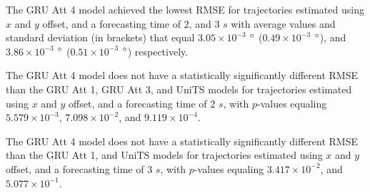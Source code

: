 \documentclass[preprint,12pt]{elsarticle}
\begin{document}
\begin{table}[!ht]
	\centering
	\caption{The average RMSE in $\degree$ ($\times 10^{-3}$), with standard deviation in brackets, across $k$-fold validation datasets for the trajectories in the $k$-fold testing datasets estimated using $x$ and $y$ offset, different RNN models, and forecasting times.}
	\label{tab:best_no_abs_RMSE}
\end{table}

The GRU Att 4 model achieved the lowest RMSE for trajectories estimated using $x$ and $y$ offset, and a forecasting time of $2$, and $3$ $s$ with average values and standard deviation (in brackets) that equal $3.05 \times 10^{-3}$ $\degree$ ($0.49 \times 10^{-3}$ $\degree$), and $3.86 \times 10^{-3}$ $\degree$ ($0.51 \times 10^{-3}$ $\degree$) respectively.

The GRU Att 4 model does not have a statistically significantly different RMSE than the GRU Att 1, GRU Att 3, and UniTS models for trajectories estimated using $x$ and $y$ offset, and a forecasting time of $2$ $s$, with $p$-values equaling $5.579 \times 10^{-3}$, $7.098 \times 10^{-2}$, and $9.119 \times 10^{-4}$.

The GRU Att 4 model does not have a statistically significantly different RMSE than the GRU Att 1, and UniTS models for trajectories estimated using $x$ and $y$ offset, and a forecasting time of $3$ $s$, with $p$-values equaling $3.417 \times 10^{-2}$, and $5.077 \times 10^{-1}$.
\end{document}
